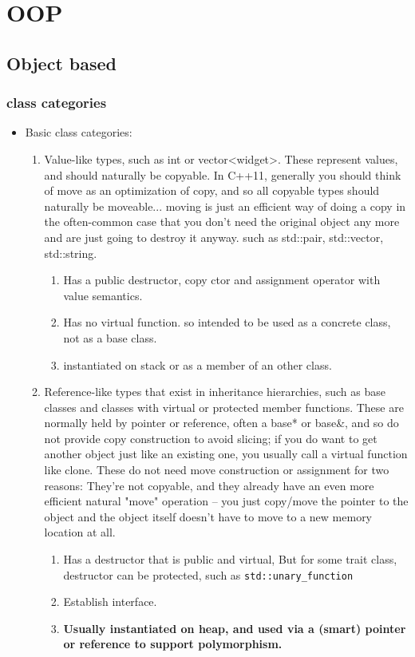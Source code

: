\documentclass[a4paper,11pt,twoside]{book}
\begin{document}
\chapter{OOP}
\section{Object based}

\subsection{class categories}
\begin{itemize}
	\item Basic class categories:
	\begin{enumerate}
 
			
		\item Value-like types, such as int or vector<widget>. These represent values, and should naturally be copyable. In C++11, generally you should think of move as an optimization of copy, and so all copyable types should naturally be moveable... moving is just an efficient way of doing a copy in the often-common case that you don't need the original object any more and are just going to destroy it anyway. such as std::pair, std::vector, std::string.
		
		\begin{enumerate}
			\item Has a public destructor, copy ctor and assignment operator with value semantics.
			\item Has no virtual function. so intended to be used as a concrete class, not as a base class.
			\item instantiated on stack or as a member of an other class.
		\end{enumerate}
		
		\item Reference-like types that exist in inheritance hierarchies, such as base classes and classes with virtual or protected member functions. These are normally held by pointer or reference, often a base* or base\&, and so do not provide copy construction to avoid slicing; if you do want to get another object just like an existing one, you usually call a virtual function like clone. These do not need move construction or assignment for two reasons: They're not copyable, and they already have an even more efficient natural "move" operation -- you just copy/move the pointer to the object and the object itself doesn't have to move to a new memory location at all.
		\begin{enumerate}
			\item Has a destructor that is public and virtual, But for some trait class, destructor can be protected, such as \texttt{std::unary\_function}
			\item Establish interface.
			\item \textbf{Usually instantiated on heap, and used via a (smart) pointer or reference to support polymorphism.}
		\end{enumerate}
		

\end{enumerate}
\end{itemize}
\end{document}
